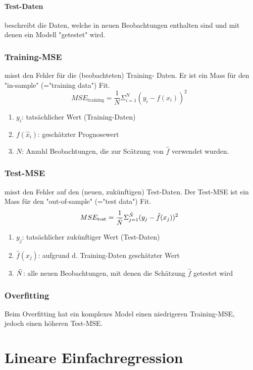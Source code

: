 \documentclass[a3paper, 8pt]{extarticle}
\begin{document}
\begin{multicols*}{5}
\paragraph{Test-Daten} beschreibt die Daten, welche in neuen Beobachtungen enthalten sind und mit denen ein Modell "getestet" wird.

\subsubsection{Training-MSE}
misst den Fehler für die (beobachteten) Training- Daten. Er ist ein Mass für den "in-sample" (="training data") Fit.
\[MSE_{\text{training}} = \frac{1}{N}\Sigma_{i=1}^N (y_i-\hat{f}(x_i))^2\]

\begin{enumerate}
    \item[]$y_i$: tatsächlicher Wert (Training-Daten)
    \item[]$f(\hat{x}_i)$: geschätzter Prognosewert
    \item[]$N$: Anzahl Beobachtungen, die zur Scätzung von $\hat{f}$ verwendet wurden.
\end{enumerate}

\subsubsection{Test-MSE}
misst den Fehler auf den (neuen, zukünftigen) Test-Daten. Der Test-MSE ist ein Mass für den "out-of-sample" (="test data") Fit.
\[MSE_{\text{test}} = \frac{1}{\Tilde{N}}\Sigma_{j=1}^{\Tilde{N}} (y_j-\hat{f}(x_j))^2\]

\begin{enumerate}
    \item[]$y_j$: tatsächlicher zukünftiger Wert (Test-Daten)
    \item[]$\hat{f}(x_j)$: aufgrund d. Training-Daten geschätzter Wert
    \item[]$\Tilde{N}$: alle neuen Beobachtungen, mit denen die Schätzung $\hat{f}$ getestet wird
\end{enumerate}
\subsubsection{Overfitting}
Beim Overfitting hat ein komplexes Model einen niedrigeren Training-MSE, jedoch einen höheren Test-MSE.
 

\section{Lineare Einfachregression} 

\end{multicols*}
\end{document}
